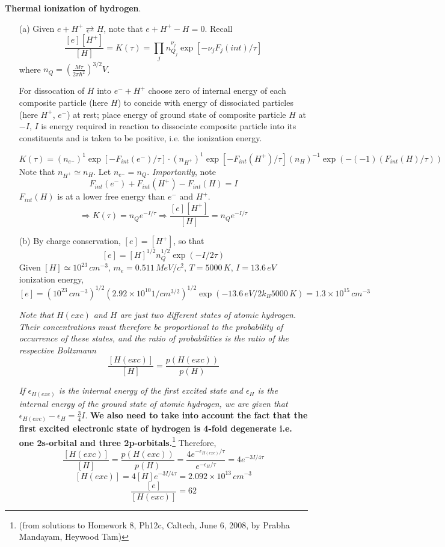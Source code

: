 \documentclass[twoside]{amsart}
\theoremstyle{plain}
\theoremstyle{definition}
\newcommand{\solutionhead}[1]
  {
   \noindent{\small\bf Solution #1.}
   }
\begin{document}
\solutionhead{2} \textbf{Thermal ionization of hydrogen}.  
\begin{itemize}
\item[(a)] Given $e + H^+ \rightleftarrows H$, note that $e + H^+ - H =0$.  Recall
\[
\frac{ [e][H^+] }{ [H] } = K(\tau) = \prod_j n_{Q_j}^{\nu_j} \exp{ [ -\nu_j F_j(int) /\tau ] }
\]
where $n_Q = \left( \frac{ M \tau}{2\pi \hbar^2 } \right)^{3/2} V$.  

For dissocation of $H$ into $e^- + H^+$ choose zero of internal energy of each composite particle (here $H$) to concide with energy of dissociated particles (here $H^+$, $e^-$) at rest; place energy of ground state of composite particle $H$ at $-I$, $I$ is energy required in reaction to dissociate composite particle into its constituents and is taken to be positive, i.e. the ionization energy.  

\[
K(\tau) = (n_{e^-})^1 \exp{ [- F_{int}(e^-)/\tau ]} \cdot (n_{H^+} )^1 \exp{ [ -F_{int}(H^+)/ \tau ] } (n_{H})^{-1} \exp{ (- (-1) (F_{int}(H)/\tau) )}
\]
Note that $n_{H^+} \simeq n_{H}$.  Let $n_{e^-} = n_Q$.  \emph{Importantly}, note
\[
\boxed{ F_{int}(e^-) + F_{int}(H^+) - F_{int}(H) = I }
\]
$F_{int}(H)$ is at a lower free energy than $e^-$ and $H^+$.  
\[
\Longrightarrow K(\tau) = n_Q e^{-I/\tau} \Longrightarrow \boxed{ \frac{ [e][H^+] }{ [H] } = n_Qe^{-I/\tau}  }
\]

\item[(b)] By charge conservation, $[e] = [H^+]$, so that 
\[
[e] = [H]^{1/2} n_Q^{1/2} \exp{ (-I/2\tau)}
\]
Given $[H] \simeq 10^{23} \, cm^{-3}$, $m_e = 0.511 \, MeV/c^2$, $T = 5000 \, K$, $I = 13.6 \, eV$ ionization energy,
\[
[e] = (10^{23} \, cm^{-3})^{1/2} ( 2.92 \times 10^{10} 1/cm^{3/2})^{1/2} \exp{ ( - 13.6 \, eV / 2 k_B 5000 \, K) } =  1.3 \times 10^{15} \, cm^{-3}
\]

\emph{Note that $H(exc)$ and $H$ are just two different states of atomic hydrogen.  Their concentrations must therefore be proportional to the probability of occurrence of these states, and the ratio of probabilities is the ratio of the respective Boltzmann}
\[
\frac{ [H(exc) ] }{[H] } = \frac{p(H(exc) )}{ p(H) }
\]

\emph{If $\epsilon_{H(exc)}$ is the internal energy of the first excited state and $\epsilon_H$ is the internal energy of the ground state of atomic hydrogen, we are given that $\epsilon_{H(exc)} - \epsilon_H = \frac{3}{4} I$}.  \textbf{We also need to take into account the fact that the first excited electronic state of hydrogen is 4-fold degenerate i.e. one 2s-orbital and three 2p-orbitals.}\footnote{(from solutions to Homework 8, Ph12c, Caltech, June 6, 2008, by Prabha Mandayam, Heywood Tam)} Therefore,
\[
\frac{ [H(exc)]}{[H]} = \frac{ p(H(exc)) }{ p(H)} = \frac{ 4e^{-\epsilon_{H(exc)}/\tau } }{ e^{-\epsilon_H/\tau} } = 4 e^{-3I/4\tau}
\]   
\[
[H(exc)] = 4[H] e^{-3I/4\tau} = \boxed{ 2.092 \times 10^{13} \, cm^{-3} }
\]
\[
\frac{ [e] }{ [H(exc) ]} = 62
\]

\end{itemize}
\end{document}
